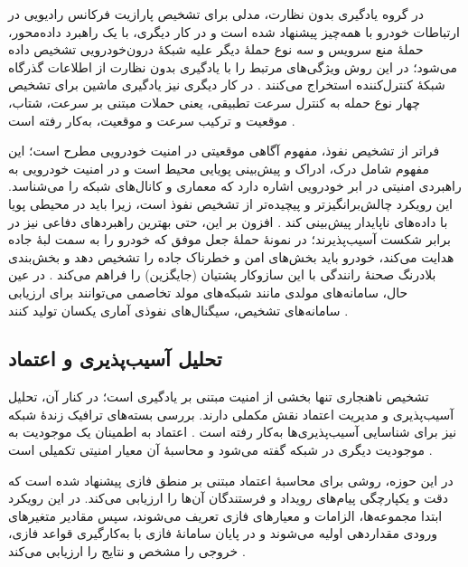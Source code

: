 \documentclass[12pt,a4paper]{article}
\begin{document}
در گروه یادگیری بدون نظارت، مدلی برای تشخیص پارازیت فرکانس رادیویی  در ارتباطات خودرو با همه‌چیز پیشنهاد شده است \cite{farsimadanReviewSecurityChallenges2025} و در کار دیگری، با یک راهبرد داده‌محور، حملهٔ منع سرویس و سه نوع حملهٔ دیگر علیه شبکهٔ درون‌خودرویی تشخیص داده می‌شود؛ در این روش ویژگی‌های مرتبط را با یادگیری بدون نظارت از اطلاعات گذرگاه شبکهٔ کنترل‌کننده  استخراج می‌کنند \cite{farsimadanReviewSecurityChallenges2025}. در کار دیگری نیز یادگیری ماشین برای تشخیص چهار نوع حمله به کنترل سرعت تطبیقی، یعنی حملات مبتنی بر سرعت، شتاب، موقعیت و ترکیب سرعت و موقعیت، به‌کار رفته است \cite{farsimadanReviewSecurityChallenges2025}.

فراتر از تشخیص نفوذ، مفهوم آگاهی موقعیتی  در امنیت خودرویی مطرح است؛ این مفهوم شامل درک، ادراک و پیش‌بینی پویایی محیط است و در امنیت خودرویی به راهبردی امنیتی در ابر خودرویی اشاره دارد که معماری و کانال‌های شبکه را می‌شناسد. این رویکرد چالش‌برانگیزتر و پیچیده‌تر از تشخیص نفوذ است، زیرا باید در محیطی پویا با داده‌های ناپایدار پیش‌بینی کند \cite{farsimadanReviewSecurityChallenges2025}. افزون بر این، حتی بهترین راهبرد‌های دفاعی نیز در برابر شکست آسیب‌پذیرند؛ در نمونهٔ حملهٔ جعل  موفق که خودرو را به سمت لبهٔ جاده هدایت می‌کند، خودرو باید بخش‌های امن و خطرناک جاده را تشخیص دهد و بخش‌بندی بلادرنگ صحنهٔ رانندگی با  این سازوکار پشتیان (جایگزین) را فراهم می‌کند \cite{farsimadanReviewSecurityChallenges2025}. در عین حال، سامانه‌های مولدی مانند شبکه‌های مولد تخاصمی  می‌توانند برای ارزیابی سامانه‌های تشخیص، سیگنال‌های نفوذی آماری یکسان تولید کنند \cite{farsimadanReviewSecurityChallenges2025}.

\subsection{تحلیل آسیب‌پذیری و اعتماد}

تشخیص ناهنجاری تنها بخشی از امنیت مبتنی بر یادگیری است؛ در کنار آن، تحلیل آسیب‌پذیری و مدیریت اعتماد نقش مکملی دارند. بررسی بسته‌های ترافیک زندهٔ شبکه نیز برای شناسایی آسیب‌پذیری‌ها به‌کار رفته است \cite{farsimadanReviewSecurityChallenges2025}. اعتماد به اطمینان یک موجودیت به موجودیت دیگری در شبکه گفته می‌شود و محاسبهٔ آن معیار امنیتی تکمیلی است \cite{farsimadanReviewSecurityChallenges2025}.

در این حوزه، روشی برای محاسبهٔ اعتماد مبتنی بر منطق فازی  پیشنهاد شده است که دقت و یکپارچگی پیام‌های رویداد و فرستندگان آن‌ها را ارزیابی می‌کند. در این رویکرد ابتدا مجموعه‌ها، الزامات و معیار‌های فازی تعریف می‌شوند، سپس مقادیر متغیر‌های ورودی مقداردهی اولیه می‌شوند و در پایان سامانهٔ فازی با به‌کارگیری قواعد فازی، خروجی را مشخص و نتایج را ارزیابی می‌کند \cite{farsimadanReviewSecurityChallenges2025}.
\end{document}
